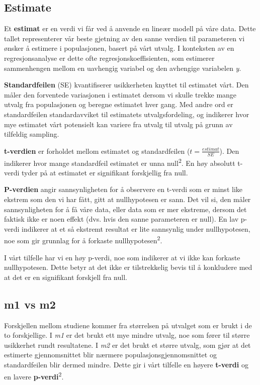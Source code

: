 \documentclass[
  letterpaper,
  DIV=11,
  numbers=noendperiod]{scrreprt}
\begin{document}
\subsection{Estimate}\label{estimate}

Et \textbf{estimat} er en verdi vi får ved å anvende en lineær modell på
våre data. Dette tallet representerer vår beste gjetning av den sanne
verdien til parameteren vi ønsker å estimere i populasjonen, basert på
vårt utvalg. I konteksten av en regresjonsanalyse er dette ofte
regresjonskoeffisienten, som estimerer sammenhengen mellom en uavhengig
variabel og den avhengige variabelen \emph{y}.

\textbf{Standardfeilen} (SE) kvantifiserer usikkerheten knyttet til
estimatet vårt. Den måler den forventede variasjonen i estimatet dersom
vi skulle trekke mange utvalg fra populasjonen og beregne estimatet hver
gang. Med andre ord er standardfeilen standardavviket til estimatets
utvalgsfordeling, og indikerer hvor mye estimatet vårt potensielt kan
variere fra utvalg til utvalg på grunn av tilfeldig sampling.

\textbf{t-verdien} er forholdet mellom estimatet og standardfeilen
(\(t = \frac{{estimat}}{{SE}}\)). Den indikerer hvor mange standardfeil
estimatet er unna null\textsuperscript{2}. En høy absolutt t-verdi tyder
på at estimatet er signifikant forskjellig fra null.

\textbf{P-verdien} angir sannsynligheten for å observere en t-verdi som
er minst like ekstrem som den vi har fått, gitt at nullhypotesen er
sann. Det vil si, den måler sannsynligheten for å få våre data, eller
data som er mer ekstreme, dersom det faktisk ikke er noen effekt (dvs.
hvis den sanne parameteren er null). En lav p-verdi indikerer at et så
ekstremt resultat er lite sannsynlig under nullhypotesen, noe som gir
grunnlag for å forkaste nullhypotesen\textsuperscript{2}.

I vårt tilfelle har vi en høy p-verdi, noe som indikerer at vi ikke kan
forkaste nullhypotesen. Dette betyr at det ikke er tilstrekkelig bevis
til å konkludere med at det er en signifikant forskjell fra null.

\subsection{m1 vs m2}\label{m1-vs-m2}

Forskjellen mellom studiene kommer fra størrelsen på utvalget som er
brukt i de to forskjellige. I \emph{m1} er det brukt ett mye mindre
utvalg, noe som fører til større usikkerhet rundt resultatene. I
\emph{m2} er det brukt et større utvalg, som gjør at det estimerte
gjennomsnittet blir nærmere populasjonsgjennomsnittet og standardfeilen
blir dermed mindre. Dette gir i vårt tilfelle en høyere \textbf{t-verdi}
og en lavere \textbf{p-verdi}\textsuperscript{2}.
\end{document}
